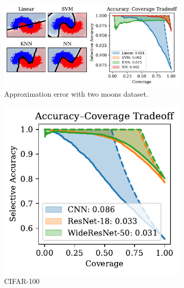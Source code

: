 \begin{figure}[t]
  \centering
  \begin{subfigure}[t]{0.49\textwidth}
  \centering
    \includegraphics[width=\linewidth]{figs/sc_bounds/2moons_models.pdf}%
    \caption{Approximation error with two moons dataset.}
    \label{fig:left}
  \end{subfigure}%
  \begin{subfigure}[t]{0.24\textwidth}
    \centering
    \includegraphics[width=\linewidth]{figs/sc_bounds/cifar100_arch_tradeoffs.pdf} 
    \caption{CIFAR-100}
    \label{fig:right}
  \end{subfigure}
  \begin{subfigure}[t]{0.24\textwidth}
    \centering

\end{subfigure}
\end{figure}
